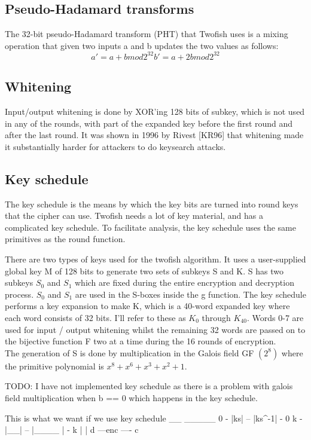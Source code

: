 \subsection{Pseudo-Hadamard transforms}
The 32-bit pseudo-Hadamard transform (PHT) that Twofish uses is a mixing operation that given two inputs a and b updates the two values as follows:
\begin{equation}
  a' = a + b mod 2^{32}
  b' = a + 2b mod 2^{32}
\end{equation}

\subsection{Whitening}
Input/output whitening is done by XOR'ing 128 bits of subkey, which is not used in any of the rounds, with part of the expanded key before the first round and after the last round. It was shown in 1996 by Rivest [KR96] that whitening made it substantially harder for attackers to do keysearch attacks.

\subsection{Key schedule}
The key schedule is the means by which the key bits are turned into round keys that the cipher can use.  Twofish needs a lot of key material, and has a complicated key schedule. To facilitate analysis, the key schedule uses the same primitives as the round function.

There are two types of keys used for the twofish algorithm. It uses a user-supplied global key M of 128 bits to generate two sets of subkeys S and K. S has two subkeys $S_0$ and $S_1$ which are fixed during the entire encryption and decryption process. $S_0$ and $S_1$ are used in the S-boxes inside the g function. The key schedule performs a key expansion to make K, which is a 40-word expanded key where each word consists of 32 bits. I'll refer to these as $K_0$ through $K_{40}$. Words 0-7 are used for input / output whitening whilst the remaining 32 words are passed on to the bijective function F two at a time during the 16 rounds of encryption. \\

The generation of S is done by multiplication in the Galois field GF $(2^8)$ where the primitive polynomial is $x^8 + x^6 + x^3 + x^2 + 1$.

TODO: I have not implemented key schedule as there is a problem with galois field multiplication when b == 0 which happens in the key schedule.
\begin{drawing}
 This is what we want if we use key schedule
     __       _____
0 - |ks| --  |ks^-1| - 0
k - |__| --  |____ | - k
          |
          |
   d  ---enc ---- c
\end{drawing}

